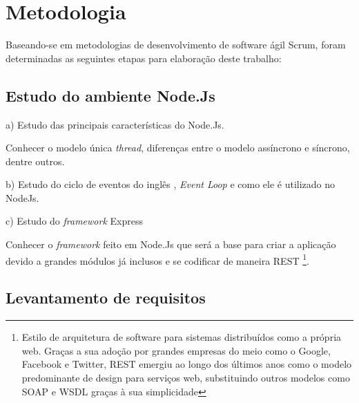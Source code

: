 \chapter{Metodologia}
\label{metodologia}

\vspace{-1.9cm}

  Baseando-se em metodologias de desenvolvimento de software ágil Scrum, foram determinadas 
  as seguintes etapas para elaboração deste trabalho:


\section{Estudo do ambiente Node.Js}
  
  \begin{compactitem}
    \item[a)] Estudo das principais características do Node.Js.
    
    Conhecer o modelo única \textit{thread}, diferenças entre o modelo assíncrono e síncrono, dentre outros.
    
    \item[b)] Estudo do ciclo de eventos do inglês , \textit{Event Loop} e como ele é utilizado no NodeJs.
    
    \item[c)] Estudo do \textit{framework} Express
    
    Conhecer o \textit{framework} feito em Node.Js que será a base para criar a 
    aplicação devido a grandes módulos já inclusos e se codificar de maneira \ac{REST} \footnote[4]{
    Estilo de arquitetura de software para sistemas distribuídos como a própria web. Graças a sua adoção por
    grandes empresas do meio como o Google, Facebook e Twitter, REST emergiu ao longo dos últimos anos como
    o modelo predominante de design para serviços web, substituindo outros modelos como SOAP e WSDL graças
    à sua simplicidade}.

  \end{compactitem}
  
\section{Levantamento de requisitos}

